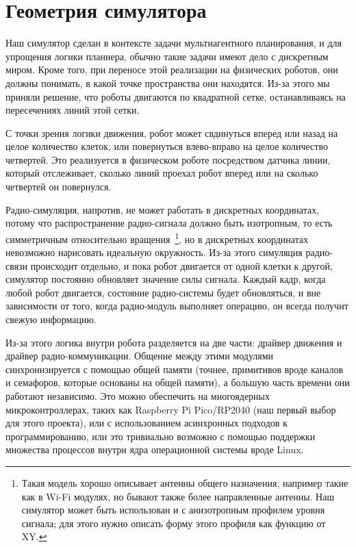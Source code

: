 \documentclass[%
]{report}
\begin{document}
\section{Геометрия симулятора}

Наш симулятор сделан в контексте задачи мультиагентного планирования,
и для упрощения логики планнера,
обычно такие задачи имеют дело с дискретным миром.
Кроме того, при переносе этой реализации на физических роботов,
они должны понимать,
в какой точке пространства они находятся.
Из-за этого мы приняли решение,
что роботы двигаются по квадратной сетке,
останавливаясь на пересечениях линий этой сетки.

С точки зрения логики движения, робот может свдинуться вперед или назад на целое количество клеток,
или повернуться влево-вправо на целое количество четвертей.
Это реализуется в физическом роботе посредством датчика линии,
который отслеживает, сколько линий проехал робот вперед
или на сколько четвертей он повернулся.

Радио-симуляция, напротив, не может работать в дискретных координатах,
потому что распространение радио-сигнала должно быть изотропным,
то есть симметричным относительно вращения~\footnote{Такая модель хорошо описывает антенны общего назначения,
например такие как в Wi-Fi модулях,
но бывают также более направленные антенны.
Наш симулятор может быть использован и с анизотропным профилем уровня сигнала;
для этого нужно описать форму этого профиля как функцию от XY.},
но в дискретных координатах невозможно нарисовать идеальную окружность.
Из-за этого симуляция радио-связи происходит отдельно,
и пока робот двигается от одной клетки к другой,
симулятор постоянно обновляет значение силы сигнала.
Каждый кадр, когда любой робот двигается,
состояние радио-системы будет обновляться,
и вне зависимости от того,
когда радио-модуль выполняет операцию,
он всегда получит свежую информацию.

Из-за этого логика внутри робота разделяется на две части: 
драйвер движения и драйвер радио-коммуникации.
Общение между этими модулями синхронизируется с помощью общей памяти (точнее, примитивов вроде каналов и семафоров, которые основаны на общей памяти),
а большую часть времени они работают независимо.
Это можно обеспечить на многоядерных микроконтроллерах,
таких как Raspberry Pi Pico/RP2040 (наш первый выбор для этого проекта),
или с использованием асинхронных подходов к программированию,
или это тривиально возможно с помощью поддержки множества процессов внутри ядра операционной системы вроде Linux.
\end{document}
